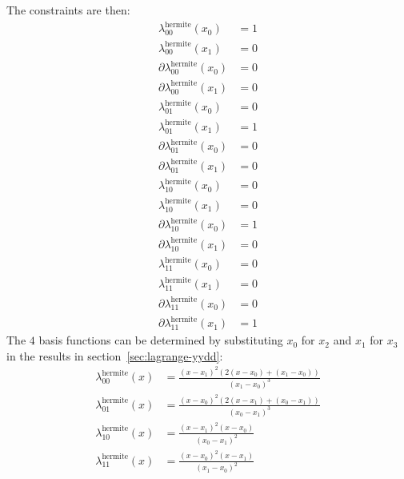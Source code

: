 The constraints are then:
\begin{align}
\lambda^{\text{hermite}}_{00}(x_0) & = 1 \\ 
\lambda^{\text{hermite}}_{00}(x_1) & = 0 \nonumber \\
\partial\lambda^{\text{hermite}}_{00}(x_0) & = 0 \nonumber \\
\partial\lambda^{\text{hermite}}_{00}(x_1) & = 0 \nonumber \\
\lambda^{\text{hermite}}_{01}(x_0) & = 0 \\ 
\lambda^{\text{hermite}}_{01}(x_1) & = 1 \nonumber \\
\partial\lambda^{\text{hermite}}_{01}(x_0) & = 0 \nonumber \\
\partial\lambda^{\text{hermite}}_{01}(x_1) & = 0 \nonumber \\
\lambda^{\text{hermite}}_{10}(x_0) & = 0 \\ 
\lambda^{\text{hermite}}_{10}(x_1) & = 0 \nonumber \\
\partial\lambda^{\text{hermite}}_{10}(x_0) & = 1 \nonumber \\
\partial\lambda^{\text{hermite}}_{10}(x_1) & = 0 \nonumber \\
\lambda^{\text{hermite}}_{11}(x_0) & = 0 \\ 
\lambda^{\text{hermite}}_{11}(x_1) & = 0 \nonumber \\
\partial\lambda^{\text{hermite}}_{11}(x_0) & = 0 \nonumber \\
\partial\lambda^{\text{hermite}}_{11}(x_1) & = 1 \nonumber 
\end{align}
The $4$ basis functions can be determined by substituting $x_0$
for $x_2$ and $x_1$ for $x_3$ in the results in 
section~\ref{sec:lagrange-yydd}:
\begin{align}
\lambda^{\text{hermite}}_{00}(x) & =
\frac
{(x-x_1)^2 \left(2(x - x_0) + (x_1 - x_0) \right)}
{(x_1-x_0)^3}
\\
\lambda^{\text{hermite}}_{01}(x) & =
\frac
{(x-x_0)^2 \left(2(x - x_1) + (x_0 - x_1) \right)}
{(x_0-x_1)^3}
\nonumber \\
\lambda^{\text{hermite}}_{10}(x) & =
\frac {(x-x_1)^2(x-x_0)} {(x_0-x_1)^2}
\nonumber \\
\lambda^{\text{hermite}}_{11}(x) & =
\frac {(x-x_0)^2(x-x_1)} {(x_1-x_0)^2}
\nonumber
\end{align}

